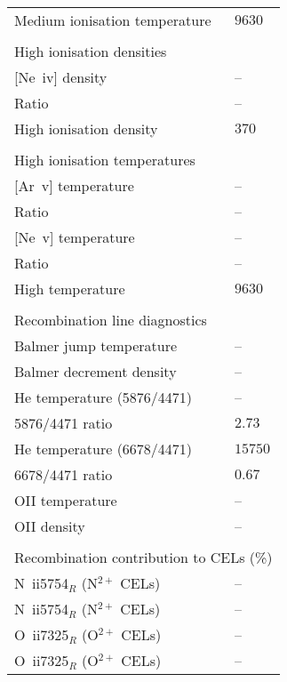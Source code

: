 \begin{longtable}[l]{ll}
 Medium ionisation temperature       & $ 9630$\\
 \vspace{0.2cm}\\\multicolumn{2}{l}{High ionisation densities}\\ \hline
 {}[Ne~{\sc iv}] density             & -- \\
 Ratio                               & -- \\
 High ionisation density             & $  370$\\
 \vspace{0.2cm}\\\multicolumn{2}{l}{High ionisation temperatures}\\ \hline
 {}[Ar~{\sc v}] temperature          & -- \\
 Ratio                               & -- \\
 {}[Ne~{\sc v}] temperature          & -- \\
 Ratio                               & -- \\
 High temperature                    & $ 9630$\\
 \vspace{0.2cm}\\\multicolumn{2}{l}{Recombination line diagnostics}\\ \hline
 Balmer jump temperature             & -- \\
 Balmer decrement density            & -- \\
 He temperature (5876/4471)          & -- \\
 5876/4471 ratio                     & $  2.73$\\
 He temperature (6678/4471)          & $15750$\\
 6678/4471 ratio                     & $  0.67$\\
 OII temperature                     & -- \\
 OII density                         & -- \\
 \vspace{0.2cm}\\\multicolumn{2}{l}{Recombination contribution to CELs (\%)}\\ \hline
 N~{\sc ii}5754$_R$ (N$^{2+}$ CELs)  & -- \\
 N~{\sc ii}5754$_R$ (N$^{2+}$ CELs)  & -- \\
 O~{\sc ii}7325$_R$ (O$^{2+}$ CELs)  & -- \\
 O~{\sc ii}7325$_R$ (O$^{2+}$ CELs)  & -- \\

\end{longtable}
